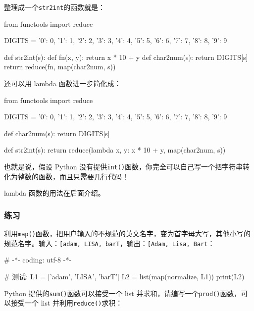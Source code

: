 整理成一个\texttt{str2int}的函数就是：

\begin{pythoncode}
from functools import reduce

DIGITS = {'0': 0, '1': 1, '2': 2, '3': 3, '4': 4, '5': 5, '6': 6, '7': 7, '8': 8, '9': 9}

def str2int(s):
    def fn(x, y):
        return x * 10 + y
    def char2num(s):
        return DIGITS[s]
    return reduce(fn, map(char2num, s))
\end{pythoncode}

还可以用 lambda 函数进一步简化成：

\begin{pythoncode}
from functools import reduce

DIGITS = {'0': 0, '1': 1, '2': 2, '3': 3, '4': 4, '5': 5, '6': 6, '7': 7, '8': 8, '9': 9}

def char2num(s):
    return DIGITS[s]

def str2int(s):
    return reduce(lambda x, y: x * 10 + y, map(char2num, s))
\end{pythoncode}

也就是说，假设 Python
没有提供\texttt{int()}函数，你完全可以自己写一个把字符串转化为整数的函数，而且只需要几行代码！

lambda 函数的用法在后面介绍。

\hypertarget{ux7ec3ux4e60}{%
\subsubsection{练习}\label{ux7ec3ux4e60}}

利用\texttt{map()}函数，把用户输入的不规范的英文名字，变为首字母大写，其他小写的规范名字。输入：\texttt{{[}\textquotesingle{}adam\textquotesingle{},\ \textquotesingle{}LISA\textquotesingle{},\ \textquotesingle{}barT\textquotesingle{}{]}}，输出：\texttt{{[}\textquotesingle{}Adam\textquotesingle{},\ \textquotesingle{}Lisa\textquotesingle{},\ \textquotesingle{}Bart\textquotesingle{}{]}}：

\begin{pythoncode}
# -*- coding: utf-8 -*-
\end{pythoncode}

\begin{pythoncode}
# 测试:
L1 = ['adam', 'LISA', 'barT']
L2 = list(map(normalize, L1))
print(L2)
\end{pythoncode}

Python 提供的\texttt{sum()}函数可以接受一个 list
并求和，请编写一个\texttt{prod()}函数，可以接受一个 list
并利用\texttt{reduce()}求积：

